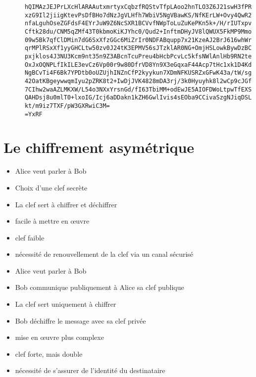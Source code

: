 \documentclass[french]{article}
\begin{document}
    \scriptsize
    \begin{verbatim}
      hQIMAzJEJPrLXcHlARAAutxmrtyxCqbzfRQStvTfpLAoo2hnTLO3Z6J21swH3fPR
      xzG9Il2jiigKtevPsDfBHo7dNzJgVLHfh7WbiV5NgVBawKS/NfKErLW+Ovy4QwR2
      nfaLguhOseZGFdsF4EYrJuW9Z6NcSXR1BCVvfNWpToLuZuKePKn5k+/H/rIUTxpv
      Cftk28du/CNM5qZMf43T0kbmoKiKJYhc0/Qud2+InftmDHyJV8lQWUX5FkMP9Mmo
      09w5Bk7qfClDMin7dG6SxXfzGGc6MiZrIr0NDFABqupp7x21KzeAJ2BrJ616whWr
      qrMPlRSxXf1yyGHCLtw50zv0J24tK3EPMV56sJTzklAR0NG+OmjHSLowkBywDzBC
      pxjklos4J3NU3Kcm9nt35n9Z3ABcnTcuPreu4bHcbPcvLc5kfsNWlAnlHb9RN2te
      OxJxOQNPLfIkILE3evCz6Vp00r9w80DfrVD8Yn9X3eGqxaF44Acp7tHc1xk1D4Kd
      NgBCvTi4F6Bk7YPDtb0oUZUjhINZnCfP2kyykun7XDmNFKUSRZxGFwK43a/tW/sg
      42OatKBgeywwqmIyu2pZRK8t2+IwDjJVK4828mDA3rj/3k0Hyuyhk8l2wCp9cJGf
      7CIhw2waAZLMKXW/L54o3NXxYrsnGd/fI63TbiMM+odEwJE5AIOFDWoLtpwTfEXS
      QAHDsj8u0mlT0+lxoIG/Icj6aDDakn1kZH6GwlIvis4sEOba9CCivaSzgNJiqDSL
      kt/m9iz7TXF/pW3GXRwiC3M=
      =YxRF
    \end{verbatim}
    \normalsize

\section{Le chiffrement asymétrique}

  \begin{multicols}{2}
      \begin{itemize}
        \item Alice veut parler à Bob
        \item Choix d'une clef secrète
        \item La clef sert à chiffrer et déchiffrer
      \end{itemize}
      \begin{itemize}
        \item facile à mettre en œuvre
        \item clef faible
        \item nécessité de renouvellement de la clef via un canal
          sécurisé
      \end{itemize}
  \end{multicols}

  \begin{multicols}{2}
      \begin{itemize}
        \item Alice veut parler à Bob
        \item Bob communique publiquement à Alice sa clef publique
        \item La clef sert uniquement à chiffrer
        \item Bob déchiffre le message avec sa clef privée
      \end{itemize}
      \begin{itemize}
        \item mise en œuvre plus complexe
        \item clef forte, mais double
        \item nécessité de s'assurer de l'identité du destinataire
      \end{itemize}
  \end{multicols}
\end{document}
